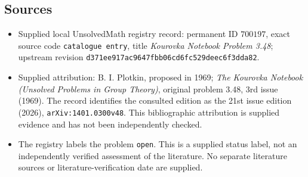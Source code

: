 \documentclass[11pt]{article}
\begin{document}
\subsection{Sources}
\begin{itemize}
\item Supplied local UnsolvedMath registry record: permanent ID \(700197\), exact source code \texttt{catalogue entry}, title \emph{Kourovka Notebook Problem 3.48}; upstream revision \texttt{d371ee917ac9647fbb06cd6fc529deec6f3dda82}.
\item Supplied attribution: B. I. Plotkin, proposed in 1969; \emph{The Kourovka Notebook (Unsolved Problems in Group Theory)}, original problem 3.48, 3rd issue (1969). The record identifies the consulted edition as the 21st issue edition (2026), \texttt{arXiv:1401.0300v48}. This bibliographic attribution is supplied evidence and has not been independently checked.
\item The registry labels the problem \texttt{open}. This is a supplied status label, not an independently verified assessment of the literature. No separate literature sources or literature-verification date are supplied.
\end{itemize}
\end{document}
